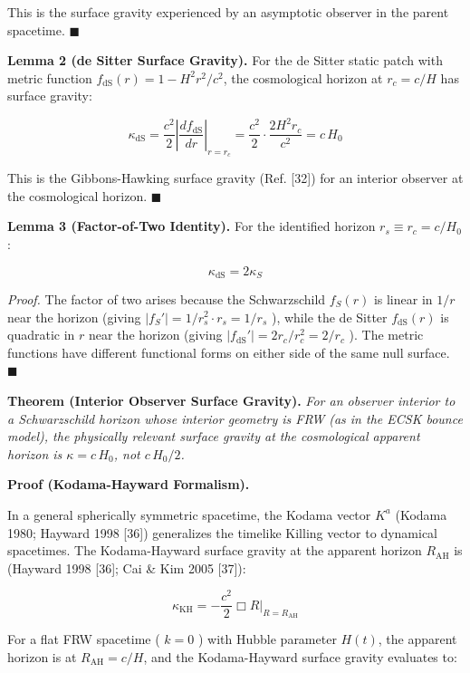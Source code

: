 \documentclass[11pt,a4paper]{article}
\theoremstyle{definition}
\theoremstyle{remark}
\begin{document}
This is the surface gravity experienced by an asymptotic observer in the parent spacetime. $\blacksquare$

\textbf{Lemma 2 (de Sitter Surface Gravity).} For the de Sitter static patch with metric function $f_{\text{dS}}(r) = 1 - H^2 r^2/c^2$, the cosmological horizon at $r_c = c/H$ has surface gravity:


\begin{equation}
\kappa_{\text{dS}} = \frac{c^2}{2} \left|\frac{df_{\text{dS}}}{dr}\right|_{r=r_c} = \frac{c^2}{2} \cdot \frac{2 H^2 r_c}{c^2} = c \, H_0
\end{equation}


This is the Gibbons-Hawking surface gravity (Ref. [32]) for an interior observer at the cosmological horizon. $\blacksquare$

\textbf{Lemma 3 (Factor-of-Two Identity).} For the identified horizon $r_s \equiv r_c = c/H_0$:


\begin{equation}
\kappa_{\text{dS}} = 2 \kappa_S
\end{equation}


\textit{Proof.} The factor of two arises because the Schwarzschild $f_S(r)$ is linear in $1/r$ near the horizon (giving $|f_S'| = 1/r_s^2 \cdot r_s = 1/r_s$ ), while the de Sitter $f_{\text{dS}}(r)$ is quadratic in $r$ near the horizon (giving $|f_{\text{dS}}'| = 2r_c/r_c^2 = 2/r_c$ ). The metric functions have different functional forms on either side of the same null surface. $\blacksquare$

\textbf{Theorem (Interior Observer Surface Gravity).} \textit{For an observer interior to a Schwarzschild horizon whose interior geometry is FRW (as in the ECSK bounce model), the physically relevant surface gravity at the cosmological apparent horizon is $\kappa = c \, H_0$, not $c \, H_0/2$.}

\textbf{Proof (Kodama-Hayward Formalism).}

In a general spherically symmetric spacetime, the Kodama vector $K^a$ (Kodama 1980; Hayward 1998 [36]) generalizes the timelike Killing vector to dynamical spacetimes. The Kodama-Hayward surface gravity at the apparent horizon $R_{\text{AH}}$ is (Hayward 1998 [36]; Cai \& Kim 2005 [37]):


\begin{equation}
\kappa_{\text{KH}} = -\frac{c^2}{2} \Box R \big|_{R = R_{\text{AH}}}
\end{equation}


For a flat FRW spacetime ( $k = 0$ ) with Hubble parameter $H(t)$, the apparent horizon is at $R_{\text{AH}} = c/H$, and the Kodama-Hayward surface gravity evaluates to:
\end{document}
